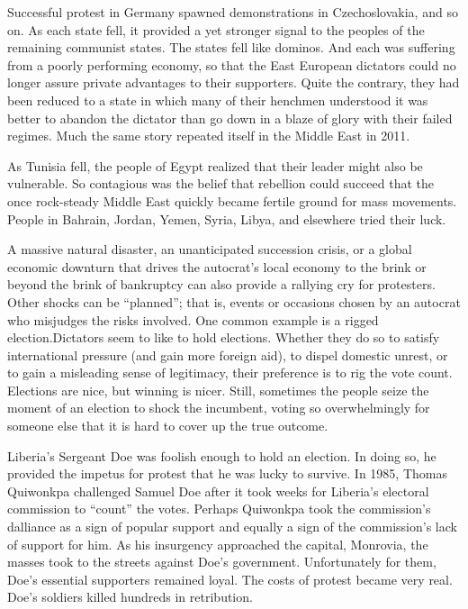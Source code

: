 \documentclass[10pt]{article}
\begin{document}
{\large Successful protest in Germany spawned demonstrations in Czechoslovakia,
and so on. As each state fell, it provided a yet stronger signal to the peoples
of the remaining communist states. The states fell like dominos. And each was
suffering from a poorly performing economy, so that the East European dictators
could no longer assure private advantages to their supporters. Quite the
contrary, they had been reduced to a state in which many of their henchmen
understood it was better to abandon the dictator than go down in a blaze of glory
with their failed regimes. Much the same story repeated itself in the Middle East
in 2011.}

{\large As Tunisia fell, the people of Egypt realized that their leader might
also be vulnerable. So contagious was the belief that rebellion could succeed
that the once rock-steady Middle East quickly became fertile ground for mass
movements. People in Bahrain, Jordan, Yemen, Syria, Libya, and elsewhere tried
their luck.}

{\large A massive natural disaster, an unanticipated succession crisis, or a
global economic downturn that drives the autocrat's local economy to the brink or
beyond the brink of bankruptcy can also provide a rallying cry for protesters.
Other shocks can be ``planned''; that is, events or occasions chosen by an
autocrat who misjudges the risks involved. One common example is a rigged
election.Dictators seem to like to hold elections. Whether they do so to satisfy
international pressure (and gain more foreign aid), to dispel domestic unrest, or
to gain a misleading sense of legitimacy, their preference is to rig the vote
count. Elections are nice, but winning is nicer. Still, sometimes the people
seize the moment of an election to shock the incumbent, voting so overwhelmingly
for someone else that it is hard to cover up the true outcome.}

{\large Liberia's Sergeant Doe was foolish enough to hold an election. In doing
so, he provided the impetus for protest that he was lucky to survive. In 1985,
Thomas Quiwonkpa challenged Samuel Doe after it took weeks for Liberia's
electoral commission to ``count'' the votes. Perhaps Quiwonkpa took the
commission's dalliance as a sign of popular support and equally a sign of the
commission's lack of support for him. As his insurgency approached the capital,
Monrovia, the masses took to the streets against Doe's government. Unfortunately
for them, Doe's essential supporters remained loyal. The costs of protest became
very real. Doe's soldiers killed hundreds in retribution.}
\end{document}
